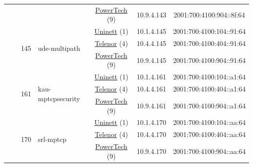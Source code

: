\begin{small}
\begin{center}
\begin{longtable}{|c|c|c|c|c|c|c|c|}
  &  &  &  & \multicolumn{2}{|c|}{\tiny{\href{http://www.powertech.no}{PowerTech} (9)}} & \tiny{10.9.4.143} & \tiny{2001:700:4100:904::8f:64} \\* \cline{3-3}\cline{4-4}\cline{5-5}\cline{6-6}\cline{7-7}\cline{8-8}
  &  & \multirow{3}{*}{\tiny{145}} & \multicolumn{1}{|l|}{\multirow{3}{*}{\tiny{ude-multipath}}} & \multicolumn{2}{|c|}{\tiny{\href{https://www.uninett.no}{Uninett} (1)}} & \tiny{10.1.4.145} & \tiny{2001:700:4100:104::91:64} \\* \cline{5-5}\cline{6-6}\cline{7-7}\cline{8-8}
  &  &  &  & \multicolumn{2}{|c|}{\tiny{\href{https://www.telenor.no}{Telenor} (4)}} & \tiny{10.4.4.145} & \tiny{2001:700:4100:404::91:64} \\* \cline{5-5}\cline{6-6}\cline{7-7}\cline{8-8}
  &  &  &  & \multicolumn{2}{|c|}{\tiny{\href{http://www.powertech.no}{PowerTech} (9)}} & \tiny{10.9.4.145} & \tiny{2001:700:4100:904::91:64} \\* \cline{3-3}\cline{4-4}\cline{5-5}\cline{6-6}\cline{7-7}\cline{8-8}
  &  & \multirow{3}{*}{\tiny{161}} & \multicolumn{1}{|l|}{\multirow{3}{*}{\tiny{kau-mptcpsecurity}}} & \multicolumn{2}{|c|}{\tiny{\href{https://www.uninett.no}{Uninett} (1)}} & \tiny{10.1.4.161} & \tiny{2001:700:4100:104::a1:64} \\* \cline{5-5}\cline{6-6}\cline{7-7}\cline{8-8}
  &  &  &  & \multicolumn{2}{|c|}{\tiny{\href{https://www.telenor.no}{Telenor} (4)}} & \tiny{10.4.4.161} & \tiny{2001:700:4100:404::a1:64} \\* \cline{5-5}\cline{6-6}\cline{7-7}\cline{8-8}
  &  &  &  & \multicolumn{2}{|c|}{\tiny{\href{http://www.powertech.no}{PowerTech} (9)}} & \tiny{10.9.4.161} & \tiny{2001:700:4100:904::a1:64} \\* \cline{3-3}\cline{4-4}\cline{5-5}\cline{6-6}\cline{7-7}\cline{8-8}
  &  & \multirow{3}{*}{\tiny{170}} & \multicolumn{1}{|l|}{\multirow{3}{*}{\tiny{srl-mptcp}}} & \multicolumn{2}{|c|}{\tiny{\href{https://www.uninett.no}{Uninett} (1)}} & \tiny{10.1.4.170} & \tiny{2001:700:4100:104::aa:64} \\* \cline{5-5}\cline{6-6}\cline{7-7}\cline{8-8}
  &  &  &  & \multicolumn{2}{|c|}{\tiny{\href{https://www.telenor.no}{Telenor} (4)}} & \tiny{10.4.4.170} & \tiny{2001:700:4100:404::aa:64} \\* \cline{5-5}\cline{6-6}\cline{7-7}\cline{8-8}
  &  &  &  & \multicolumn{2}{|c|}{\tiny{\href{http://www.powertech.no}{PowerTech} (9)}} & \tiny{10.9.4.170} & \tiny{2001:700:4100:904::aa:64} \\* \cline{3-3}\cline{4-4}\cline{5-5}\cline{6-6}\cline{7-7}\cline{8-8}

\end{longtable}
\end{center}
\end{small}
